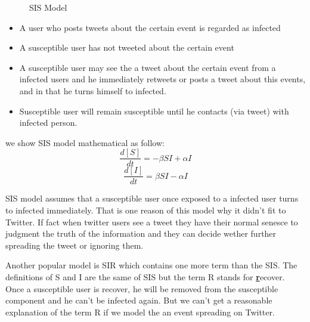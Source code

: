 \begin{figure}[!h]
\center
\def\layersep{2.5cm}
   \caption{SIS Model}
\label{fig:SIS}
\end{figure}
	
\begin{itemize}
\item A user who posts tweets about the certain event is regarded as infected
\item A susceptible user has not tweeted about the certain event
\item A susceptible user may see the a tweet about the certain event from a infected users and he immediately retweets or posts a tweet about this events, and in that he turns himself to infected.
\item Susceptible user will remain susceptible until he contacts (via tweet) with infected person.
\end{itemize}
we show SIS model mathematical as follow:
\begin{equation}
\frac{d[S]}{dt}=- \beta SI+\alpha I
\end{equation}
\begin{equation}
\frac{d[I]}{dt}= \beta SI-\alpha I
\end{equation}

SIS model assumes that a susceptible user once exposed to a infected user turns to infected immediately. That is one reason of this model why it didn't fit to Twitter. If fact when twitter users see a tweet they have their normal senesce to judgment the truth of the information and they can decide wether  further spreading the tweet or ignoring them.

Another popular model is SIR which contains one more term than the SIS. The definitions of S and I are the same of SIS but the term R stands for \textbf{\underline{r}}ecover. Once a susceptible user is recover, he will be removed from the susceptible component and he can't be infected again. But we can't get a reasonable explanation of the term R if we model the an event spreading on Twitter.

